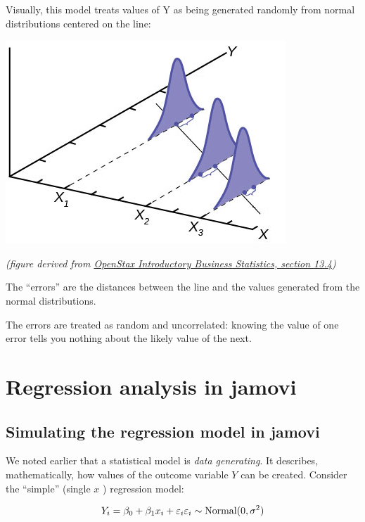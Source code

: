 \documentclass[
  letterpaper,
  DIV=11,
  numbers=noendperiod]{scrreprt}
\begin{document}
Visually, this model treats values of Y as being generated randomly from
normal distributions centered on the line:

\includegraphics{images/mod2_pt1 (6).png}

\emph{(figure derived from
\href{https://openstax.org/books/introductory-business-statistics/pages/13-4-the-regression-equation}{OpenStax
Introductory Business Statistics, section 13.4})}

The ``errors'' are the distances between the line and the values
generated from the normal distributions.

The errors are treated as random and uncorrelated: knowing the value of
one error tells you nothing about the likely value of the next.

\hypertarget{regression-analysis-in-jamovi}{%
\section{Regression analysis in
jamovi}\label{regression-analysis-in-jamovi}}

\hypertarget{simulating-the-regression-model-in-jamovi}{%
\subsection{Simulating the regression model in
jamovi}\label{simulating-the-regression-model-in-jamovi}}

We noted earlier that a statistical model is \emph{data generating}. It
describes, mathematically, how values of the outcome variable \(Y\) can
be created. Consider the ``simple'' (single \(x\) ) regression model:

\[
Y_i=\beta_0+\beta_1x_{i} + \varepsilon_i \\
\varepsilon_i \sim \text{Normal}(0,\sigma^2) 
\]
\end{document}
